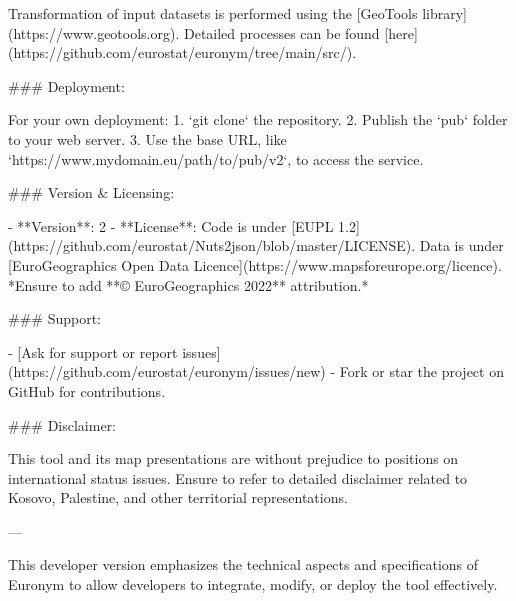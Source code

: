 Transformation of input datasets is performed using the [GeoTools library](https://www.geotools.org). Detailed processes can be found [here](https://github.com/eurostat/euronym/tree/main/src/).

### Deployment:

For your own deployment:
1. `git clone` the repository.
2. Publish the `pub` folder to your web server.
3. Use the base URL, like `https://www.mydomain.eu/path/to/pub/v2`, to access the service.

### Version & Licensing:

- **Version**: 2
- **License**: Code is under [EUPL 1.2](https://github.com/eurostat/Nuts2json/blob/master/LICENSE). Data is under [EuroGeographics Open Data Licence](https://www.mapsforeurope.org/licence). *Ensure to add **© EuroGeographics 2022** attribution.*

### Support:

- [Ask for support or report issues](https://github.com/eurostat/euronym/issues/new)
- Fork or star the project on GitHub for contributions.

### Disclaimer:

This tool and its map presentations are without prejudice to positions on international status issues. Ensure to refer to detailed disclaimer related to Kosovo, Palestine, and other territorial representations.

---

This developer version emphasizes the technical aspects and specifications of Euronym to allow developers to integrate, modify, or deploy the tool effectively.